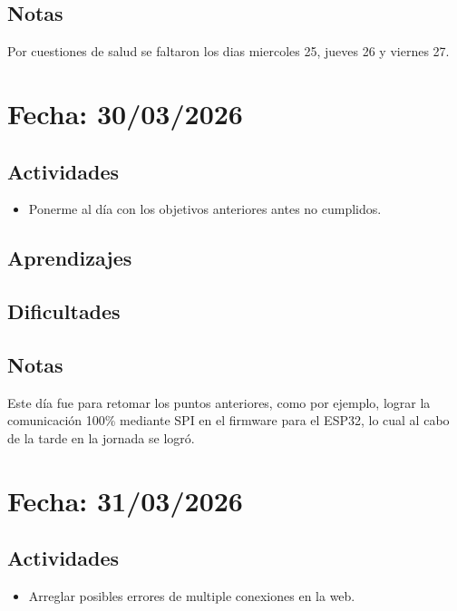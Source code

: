 \documentclass[12pt, a4paper]{article}
\begin{document}
    \subsection*{Notas}

    Por cuestiones de salud se faltaron los dias miercoles 25, jueves 26 y viernes 27. 

    \section*{Fecha: 30/03/2026}

    \subsection*{Actividades}

    \begin{itemize}
        \item Ponerme al día con los objetivos anteriores antes no cumplidos.
    \end{itemize}

    \subsection*{Aprendizajes}

    \subsection*{Dificultades}

    \subsection*{Notas}

    Este día fue para retomar los puntos anteriores, como por ejemplo, lograr la comunicación 100\% mediante SPI en el firmware para el ESP32, lo cual al cabo de la tarde en la jornada se logró.

    \section*{Fecha: 31/03/2026}

    \subsection*{Actividades}

    \begin{itemize}
        \item Arreglar posibles errores de multiple conexiones en la web.
    \end{itemize}
\end{document}
